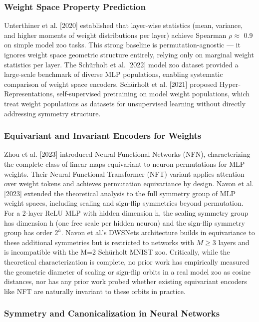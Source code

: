
\subsubsection{Weight Space Property Prediction}

Unterthiner et al. [2020] established that layer-wise statistics (mean, variance, and higher moments of weight distributions per layer) achieve Spearman $\rho \approx$ 0.9 on simple model zoo tasks. This strong baseline is permutation-agnostic --- it ignores weight space geometric structure entirely, relying only on marginal weight statistics per layer. The Schürholt et al. [2022] model zoo dataset provided a large-scale benchmark of diverse MLP populations, enabling systematic comparison of weight space encoders. Schürholt et al. [2021] proposed Hyper-Representations, self-supervised pretraining on model weight populations, which treat weight populations as datasets for unsupervised learning without directly addressing symmetry structure.

\subsubsection{Equivariant and Invariant Encoders for Weights}

Zhou et al. [2023] introduced Neural Functional Networks (NFN), characterizing the complete class of linear maps equivariant to neuron permutations for MLP weights. Their Neural Functional Transformer (NFT) variant applies attention over weight tokens and achieves permutation equivariance by design. Navon et al. [2023] extended the theoretical analysis to the full symmetry group of MLP weight spaces, including scaling and sign-flip symmetries beyond permutation. For a 2-layer ReLU MLP with hidden dimension h, the scaling symmetry group has dimension h (one free scale per hidden neuron) and the sign-flip symmetry group has order $2^h$. Navon et al.'s DWSNets architecture builds in equivariance to these additional symmetries but is restricted to networks with $M\geq 3$ layers and is incompatible with the M=2 Schürholt MNIST zoo. Critically, while the theoretical characterization is complete, no prior work has empirically measured the geometric diameter of scaling or sign-flip orbits in a real model zoo as cosine distances, nor has any prior work probed whether existing equivariant encoders like NFT are naturally invariant to these orbits in practice.

\subsubsection{Symmetry and Canonicalization in Neural Networks}

